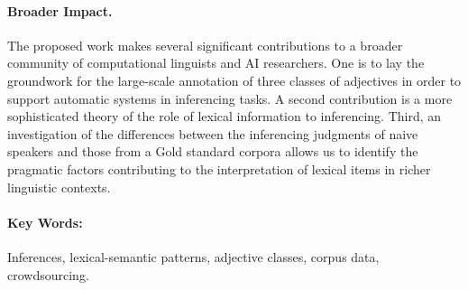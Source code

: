 \documentclass[10pt]{article}
\begin{document}
\paragraph{Broader Impact.}
The proposed work  makes several significant contributions to a broader community of computational linguists and AI researchers. 
One is to lay the groundwork for the 
large-scale annotation of three classes of adjectives in order to support automatic systems in inferencing tasks. A second contribution is a more sophisticated theory 
of the role of lexical information to inferencing. Third, an investigation of the differences between the inferencing judgments of naive speakers and those from a  
Gold standard corpora allows us to identify the pragmatic factors contributing to the interpretation of lexical items in richer linguistic contexts. 


\vspace{-1.2em}


\paragraph{Key Words:} Inferences, lexical-semantic patterns, adjective classes, corpus data, crowdsourcing. 
\end{document}
